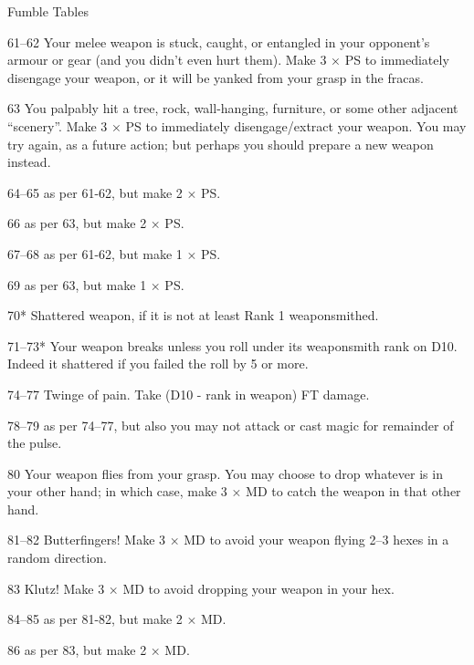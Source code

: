 \begin{Chapter}{Fumble Tables}
\begin{Description}
\item[61–62] Your melee weapon is stuck, caught, or entangled in your
  opponent’s armour or gear (and you didn’t even hurt them). Make 3 ×
  PS to immediately disengage your weapon, or it will be yanked from
  your grasp in the fracas.

\item[63] You palpably hit a tree, rock, wall-hanging, furniture, or
  some other adjacent “scenery”.  Make 3 × PS to immediately
  disengage/extract your weapon. You may try again, as a future
  action; but perhaps you should prepare a new weapon instead.

\item[64–65] as per 61-62, but make 2 × PS.

\item[66] as per 63, but make 2 × PS.

\item[67–68] as per 61-62, but make 1 × PS.

\item[69] as per 63, but make 1 × PS.

\item[70*] Shattered weapon, if it is not at least Rank 1
  weaponsmithed.

\item[71–73*] Your weapon breaks unless you roll under its weaponsmith
  rank on D10. Indeed it shattered if you failed the roll by 5 or
  more.

\item[74–77] Twinge of pain. Take (D10 - rank in weapon) FT damage.

\item[78–79] as per 74–77, but also you may not attack or cast magic
  for remainder of the pulse.

\item[80] Your weapon flies from your grasp. You may choose to drop
  whatever is in your other hand; in which case, make 3 × MD to catch
  the weapon in that other hand.

\item[81–82] Butterfingers! Make 3 × MD to avoid your weapon flying
  2–3 hexes in a random direction.

\item[83] Klutz! Make 3 × MD to avoid dropping your weapon in your
  hex.

\item[84–85] as per 81-82, but make 2 × MD.

\item[86] as per 83, but make 2 × MD.


\end{Description}
\end{Chapter}
